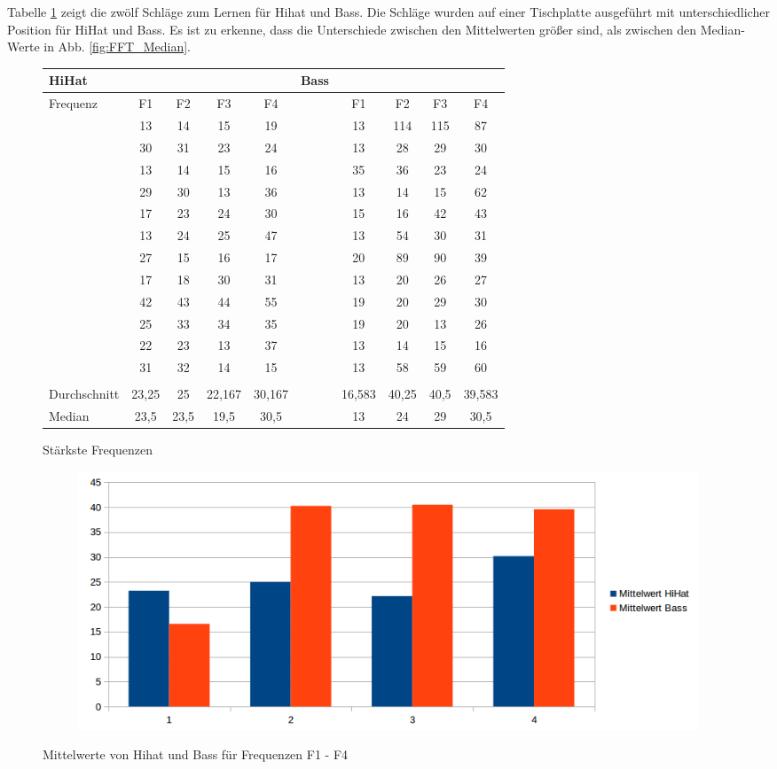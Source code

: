 Tabelle \ref{tab:FFT} zeigt die zwölf Schläge zum Lernen für Hihat und Bass.
Die Schläge wurden auf einer Tischplatte ausgeführt mit unterschiedlicher Position für HiHat und Bass.
Es ist zu erkenne, dass die Unterschiede zwischen den Mittelwerten größer sind, als zwischen den Median-Werte in Abb. \ref{fig:FFT_Median}.

\begin{figure}[H]
	\centering
	\caption{Stärkste Frequenzen}
	\begin{tabular}{l c c c c | l c c c c}
		HiHat &&&& &Bass \\
		\hline
		Frequenz & F1 & F2 & F3 & F4  & & F1 & F2 & F3 & F4\\	
		& 13 & 14 & 15 & 19  &&13& 114& 115& 87\\
		& 30 & 31 & 23 & 24 &&13& 28& 29& 30\\
		& 13& 14& 15& 16 &&35& 36& 23& 24\\
		& 29& 30& 13&36 &&13& 14& 15& 62\\
		& 17& 23&24& 30 	&&15& 16& 42& 43\\
		&13& 24& 25& 47	&&13& 54& 30& 31\\

		&27& 15& 16& 17	&&20& 89& 90& 39\\

		 &17& 18& 30& 31 &&13& 20& 26& 27\\

		&42& 43& 44& 55		&&19& 20& 29& 30\\

		 &25& 33& 34& 35 &&19& 20& 13& 26 \\

		&22& 23& 13& 37		&&13& 14& 15& 16\\

		&31& 32& 14& 15  &&13& 58& 59& 60\\
		\\
		\hline
		Durchschnitt & 23,25&	25	&22,167& 30,167 && 16,583	&40,25&	40,5&	39,583	\\
		Median & 23,5 &	23,5& 19,5	& 30,5 && 13 &	24	& 29	 &30,5 \\		 
		

	\end{tabular}
	\label{tab:FFT}
\end{figure}

\begin{figure}[H]
\centering
\begin{subfigure}{.5\textwidth}
		\includegraphics[scale=0.5]{figures/Mittelwert_hihatbass.png}
\end{subfigure}
\caption{Mittelwerte von Hihat und Bass für Frequenzen F1 - F4}
\label{fig:FFT_Mittelwerte}
\end{figure}


